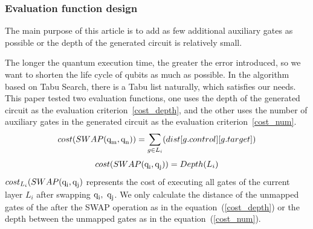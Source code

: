 \documentclass[runningheads]{llncs}
\begin{document}
\subsubsection{Evaluation function design }
The main purpose of this article is to add as few additional auxiliary gates as possible or the depth of the generated circuit is relatively small.

The longer the quantum execution time, the greater the error introduced, so we want to shorten the life cycle of qubits as much as possible. In the algorithm based on Tabu Search, there is a Tabu list naturally, which satisfies our needs. This paper tested two evaluation functions, one uses the depth of the generated circuit as the evaluation criterion~\ref{cost_depth}, and the other uses the number of auxiliary gates in the generated circuit as the evaluation criterion~\ref{cost_num}.
\begin{equation}
	cost(SWAP(\textup{q}_\textup{m},\textup{q}_\textup{n}))= \sum_{g \in L_{i}}(dist[g.control][g.target])
	\label{cost_num}
	\end{equation}
	\begin{equation}
		cost(SWAP(\textup{q}_\textup{i},\textup{q}_\textup{j}))= Depth(L_{i})
		\label{cost_depth}
		\end{equation}
$cost_{L_i}(SWAP(\textup{q}_\textup{i},\textup{q}_\textup{j})$ represents the cost of executing all gates of the current layer $L_i$ 
after swapping $\textup{q}_\textup{i}, \ \textup{q}_\textup{j}$. We only calculate the distance of the unmapped gates of the after the SWAP operation as in the equation~(\ref{cost_depth}) or the depth between the unmapped gates as in the equation~(\ref{cost_num}).
\end{document}
